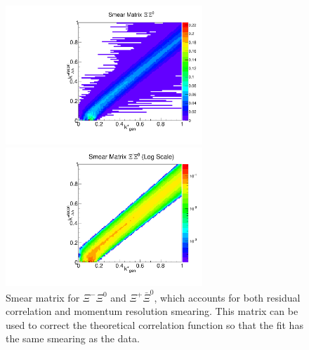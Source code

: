 \begin{figure}[ht]
\begin{minipage}{17.5pc}
\includegraphics[width=17.5pc]{Figures/SmearMatrices/2016-7-19-SmearMatrixXiCXi0NormLLAA.pdf}
\end{minipage}\hspace{0.5pc}
\begin{minipage}{17.5pc}
\includegraphics[width=17.5pc]{Figures/SmearMatrices/2016-7-19-SmearMatrixXiCXi0NormLLAALog.pdf}
\end{minipage} 
\caption[Smear matrix -- $\Xi^{-}\Xi^0$ and $\Xi^{+}\bar{\Xi}^0$]{
Smear matrix for $\Xi^{-}\Xi^0$ and $\Xi^{+}\bar{\Xi}^0$, which accounts for both residual correlation and momentum resolution smearing. This matrix can be used to correct the theoretical correlation function so that the fit has the same smearing as the data.
}
\end{figure}

